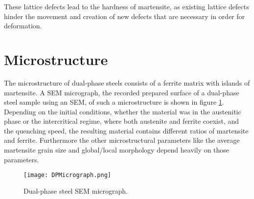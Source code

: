 These lattice defects lead to the hardness of martensite, as existing lattice defects hinder the movement and creation of new defects that are necessary in order for deformation.



\section{Microstructure}

The microstructure of dual-phase steels consists of a ferrite matrix with islands of martensite. A SEM micrograph, the recorded prepared surface of a dual-phase steel sample using an SEM, of such a microstructure is shown in figure \ref{fig:DPMicrostructure}. Depending on the initial conditions, whether the material was in the austenitic phase or the intercritical regime, where both austenite and ferrite coexist, and the quenching speed, the resulting material contains different ratios of martensite and ferrite. Furthermore the other microstructural parameters like the average martensite grain size and global/local morphology depend heavily on those parameters.  

\begin{figure}[H]
\centering
  \texttt{[image: DPMicrograph.png]}
  \caption{Dual-phase steel SEM micrograph.}
  \label{fig:DPMicrostructure}
\end{figure}

%
%


